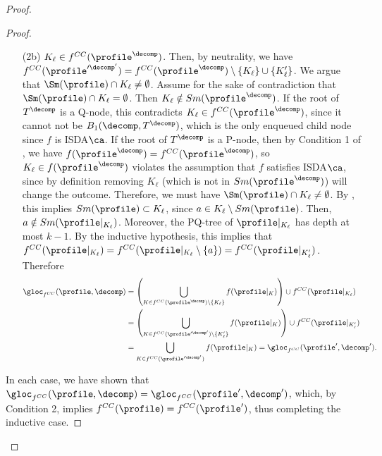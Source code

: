 \begin{proof}
\begin{proof}
\begin{enumerate}
\begin{enumerate}
            \item[(2b)] $K_\ell \in f^{CC}(\profile^\decomp)$. Then, by neutrality, we have $f^{CC}(\profile'^{\decomp'})=f^{CC}(\profile^\decomp) \setminus \{K_\ell\} \cup \{K'_\ell\}$. We argue that $\Sm(\profile) \cap K_\ell \neq  \emptyset$. Assume for the sake of contradiction that  $\Sm(\profile) \cap K_\ell =  \emptyset$. Then $K_\ell \notin Sm(\profile^\decomp)$. If the root of $T^\decomp$ is a Q-node, this contradicts $K_\ell \in f^{CC}(\profile^\decomp)$, since it cannot not be $B_1(\decomp, T^{\decomp})$, which is the only enqueued child node since $f$ is ISDA$\ca$. If the root of $T^\decomp$ is a P-node, then by Condition 1 of , we have $f(\profile^\decomp) = f^{CC}(\profile^\decomp)$, so $K_\ell \in f(\profile^\decomp)$ violates the assumption that $f$ satisfies ISDA$\ca$, since by definition removing $K_\ell$ (which is not in $Sm(\profile^\decomp)$) will change the outcome. Therefore, we must have  $\Sm(\profile) \cap K_\ell \neq  \emptyset$. By , this implies  $Sm(\profile) \subset K_\ell$, since $a \in K_\ell \setminus Sm(\profile)$. Then, $a \notin Sm(\profile|_{K_\ell})$. Moreover, the PQ-tree of $\profile|_{K_\ell}$ has depth at most $k-1$. By the inductive hypothesis, this implies that $f^{CC}(\profile|_{K_\ell}) = f^{CC}(\profile|_{K_\ell} \setminus\{a\}) =f^{CC}(\profile|_{K'_\ell})$. Therefore
            \begin{align*}
                \gloc_{f^{CC}}(\profile, \decomp) &= \left(\bigcup_{K \in f^{CC}(\profile^{\decomp}) \setminus\{K_\ell\}} f(\profile|_{K})\right) \cup f^{CC}(\profile|_{K_\ell}) \\
                &= \left(\bigcup_{K \in f^{CC}(\profile'^{\decomp'}) \setminus\{K'_\ell\}} f(\profile|_{K})\right) \cup f^{CC}(\profile|_{K'_\ell}) \\
                &=\bigcup_{K \in f^{CC}(\profile'^{\decomp'}) } f(\profile|_{K})= \gloc_{f^{CC}}(\profile', \decomp').
            \end{align*}
        \end{enumerate}
    \end{enumerate}
    In each case, we have shown that $ \gloc_{f^{CC}}(\profile, \decomp)=  \gloc_{f^{CC}}(\profile', \decomp')$, which, by Condition 2, implies $f^{CC}(\profile)=f^{CC}(\profile')$, thus completing the inductive case.
\end{proof}    

\begin{lemma}\label{lemma:cc_participation}


\end{lemma}
\end{proof}
